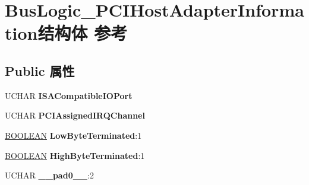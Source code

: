 \hypertarget{struct_bus_logic___p_c_i_host_adapter_information}{}\section{Bus\+Logic\+\_\+\+P\+C\+I\+Host\+Adapter\+Information结构体 参考}
\label{struct_bus_logic___p_c_i_host_adapter_information}
\subsection*{Public 属性}
\begin{DoxyCompactItemize}
\item 
\mbox{\label{struct_bus_logic___p_c_i_host_adapter_information_a4c22da5f97f8b5c26569675bbc627389}} 
U\+C\+H\+AR {\bfseries I\+S\+A\+Compatible\+I\+O\+Port}
\item 
\mbox{\label{struct_bus_logic___p_c_i_host_adapter_information_aaebb48feb9dc0158d6b1790e39717a7b}} 
U\+C\+H\+AR {\bfseries P\+C\+I\+Assigned\+I\+R\+Q\+Channel}
\item 
\mbox{\label{struct_bus_logic___p_c_i_host_adapter_information_a3b3e9b79b4ff5815ebeb932017e2d4ac}} 
\hyperlink{_processor_bind_8h_a112e3146cb38b6ee95e64d85842e380a}{B\+O\+O\+L\+E\+AN} {\bfseries Low\+Byte\+Terminated}\+:1
\item 
\mbox{\label{struct_bus_logic___p_c_i_host_adapter_information_ae5bdbf8a25d28accfac1428220e891c6}} 
\hyperlink{_processor_bind_8h_a112e3146cb38b6ee95e64d85842e380a}{B\+O\+O\+L\+E\+AN} {\bfseries High\+Byte\+Terminated}\+:1
\item 
\mbox{\label{struct_bus_logic___p_c_i_host_adapter_information_ad3fc76788dd9bc86914103fee94738a0}} 
U\+C\+H\+AR {\bfseries \+\_\+\+\_\+pad0\+\_\+\+\_\+}\+:2
\item 
\mbox{\label{struct_bus_logic___p_c_i_host_adapter_information_a6a9a787680755732f07250a4d6c05b64}} 

\end{DoxyCompactItemize}
